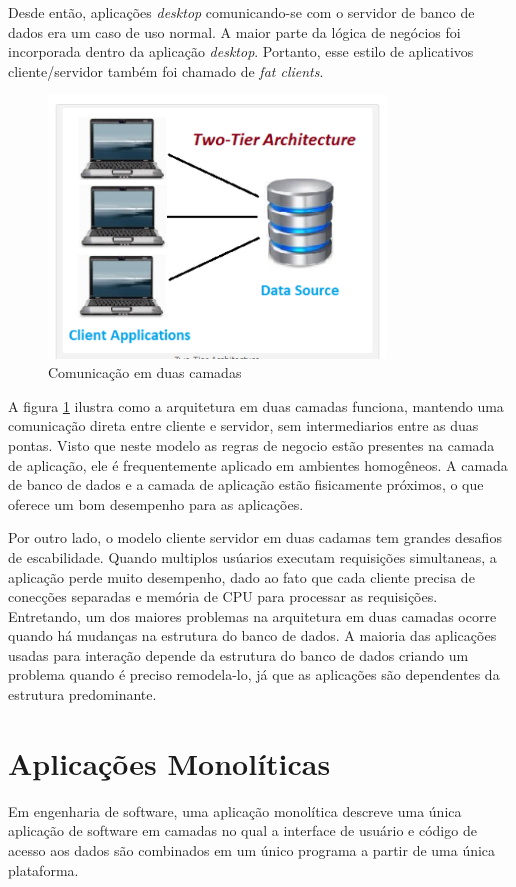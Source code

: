 Desde então, aplicações \textit{desktop} comunicando-se com o servidor de banco de dados era um caso de uso normal. A maior parte da lógica de negócios foi incorporada dentro da aplicação \textit{desktop}. Portanto, esse estilo de aplicativos cliente/servidor também foi chamado de \textit{fat clients}. 

\begin{figure}[ht]
    \centering
    \includegraphics[width=0.8\textwidth]{figuras/two-tier.png}
    \caption{Comunicação em duas camadas}
    \label{fig:two-tier}
\end{figure}

A figura \ref{fig:two-tier} ilustra como a arquitetura em duas camadas funciona, mantendo uma comunicação direta entre cliente e servidor, sem intermediarios entre as duas pontas. Visto que neste modelo as regras de negocio estão presentes na camada de aplicação, ele é frequentemente aplicado em ambientes homogêneos. A camada de banco de dados e a camada de aplicação estão fisicamente próximos, o que oferece um bom desempenho para as aplicações.

Por outro lado, o modelo cliente servidor em duas cadamas tem grandes desafios de escabilidade. Quando multiplos usúarios executam requisições simultaneas, a aplicação perde muito desempenho, dado ao fato que cada cliente precisa de conecções separadas e memória de CPU para processar as requisições. Entretando, um dos maiores problemas na arquitetura em duas camadas ocorre quando há mudanças na estrutura do banco de dados. A maioria das aplicações usadas para interação depende da estrutura do banco de dados criando um problema quando é preciso remodela-lo, já que as aplicações são dependentes da estrutura predominante.

\section{Aplicações Monolíticas}\label{sec:monolitico}
Em engenharia de software, uma aplicação monolítica descreve uma única aplicação de software em camadas no qual a interface de usuário e código de acesso aos dados são combinados em um único programa a partir de uma única plataforma.

